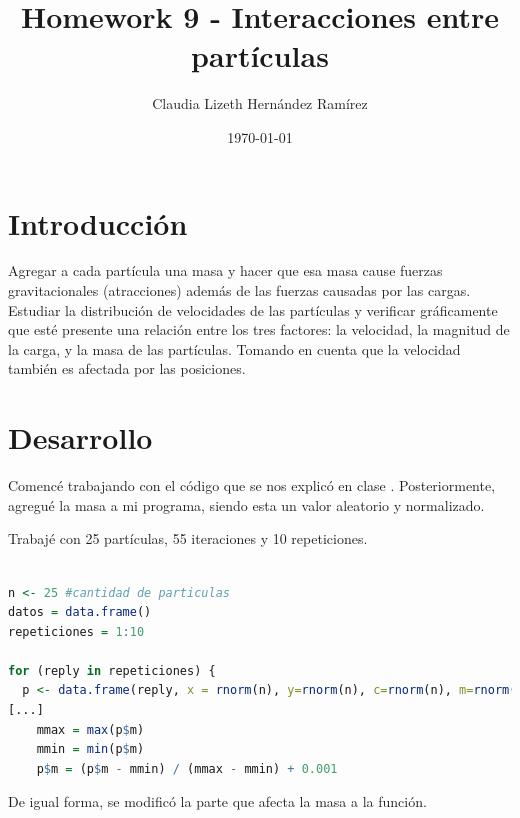 \documentclass{article}
\author{Claudia Lizeth Hern\'andez Ram\'irez} %
\title{Homework 9 - Interacciones entre part\'iculas} %
\date{\today}
\begin{document}

\maketitle %



\section{Introducci\'{o}n}\label{intro} %
Agregar a cada part\'icula una masa y hacer que esa masa cause fuerzas gravitacionales (atracciones) adem\'as de las fuerzas causadas por las cargas. Estudiar la distribuci\'on de velocidades de las part\'iculas y verificar gr\'aficamente que est\'e presente una relaci\'on entre los tres factores: la velocidad, la magnitud de la carga, y la masa de las part\'iculas. Tomando en cuenta que la velocidad tambi\'en es afectada por las posiciones.


\section{Desarrollo}\label{desarrollo} %

Comenc\'e trabajando con el c\'odigo que se nos explic\'o en clase \cite{Cbase}. Posteriormente, agregu\'e la masa a mi programa, siendo esta un valor aleatorio y normalizado.

Trabaj\'e con 25 part\'iculas, 55 iteraciones y 10 repeticiones.

\begin{lstlisting}[language=R, caption= Segmento de c\'odigo se agrega la masa.]

n <- 25 #cantidad de particulas
datos = data.frame()
repeticiones = 1:10

for (reply in repeticiones) {
  p <- data.frame(reply, x = rnorm(n), y=rnorm(n), c=rnorm(n), m=rnorm(n))
[...]
    mmax = max(p$m)
    mmin = min(p$m)
    p$m = (p$m - mmin) / (mmax - mmin) + 0.001
\end{lstlisting}

De igual forma, se modific\'o la parte que afecta la masa a la funci\'on.
\end{document}
